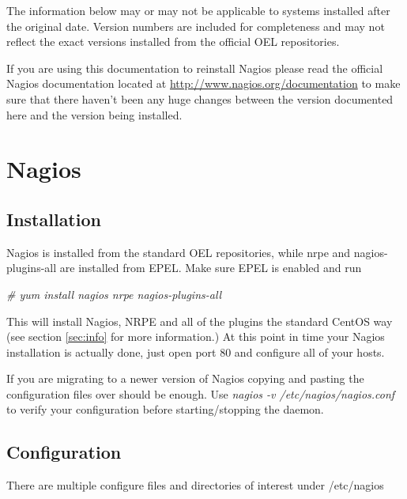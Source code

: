 \documentclass[a4paper]{article}
\begin{document}
The information below may or may not be applicable to systems installed after the original date. Version numbers are included for completeness and may not reflect the exact versions installed from the official OEL repositories.

If you are using this documentation to reinstall Nagios please read the official Nagios documentation located at \url{http://www.nagios.org/documentation} to make sure that there haven't been any huge changes between the version documented here and the version being installed. 

\section{Nagios}

\subsection{Installation}
Nagios is installed from the standard OEL repositories, while nrpe and nagios-plugins-all are installed from EPEL. Make sure EPEL is enabled and run
\begin{center}
	\textit{\# yum install nagios nrpe nagios-plugins-all}
\end{center}
This will install Nagios, NRPE and all of the plugins the standard CentOS way (see section \ref{sec:info} for more information.) At this point in time your Nagios installation is actually done, just open port 80 and configure all of your hosts.

If you are migrating to a newer version of Nagios copying and pasting the configuration files over should be enough. Use \textit{nagios -v /etc/nagios/nagios.conf} to verify your configuration before starting/stopping the daemon.

\subsection{Configuration}

There are multiple configure files and directories of interest under /etc/nagios
\end{document}
